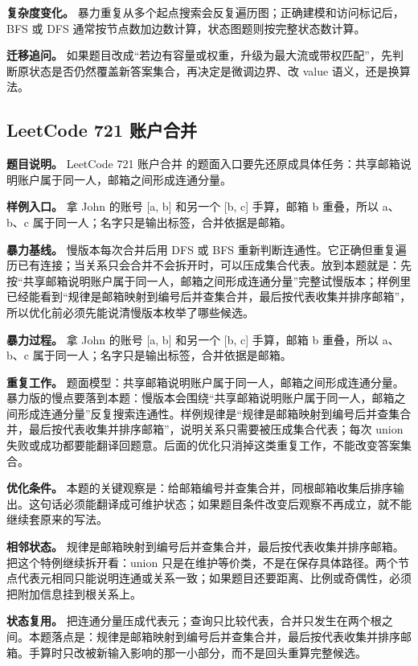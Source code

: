 \textbf{复杂度变化。} 暴力重复从多个起点搜索会反复遍历图；正确建模和访问标记后，BFS 或 DFS 通常按节点数加边数计算，状态图题则按完整状态数计算。

\textbf{迁移追问。} 如果题目改成“若边有容量或权重，升级为最大流或带权匹配”，先判断原状态是否仍然覆盖新答案集合，再决定是微调边界、改 value 语义，还是换算法。

\subsection{LeetCode 721 账户合并}

\textbf{题目说明。} LeetCode 721 账户合并 的题面入口要先还原成具体任务：共享邮箱说明账户属于同一人，邮箱之间形成连通分量。

\textbf{样例入口。} 拿 John 的账号 [a, b] 和另一个 [b, c] 手算，邮箱 b 重叠，所以 a、b、c 属于同一人；名字只是输出标签，合并依据是邮箱。

\textbf{暴力基线。} 慢版本每次合并后用 DFS 或 BFS 重新判断连通性。它正确但重复遍历已有连接；当关系只会合并不会拆开时，可以压成集合代表。放到本题就是：先按“共享邮箱说明账户属于同一人，邮箱之间形成连通分量”完整试慢版本；样例里已经能看到“规律是邮箱映射到编号后并查集合并，最后按代表收集并排序邮箱”，所以优化前必须先能说清慢版本枚举了哪些候选。

\textbf{暴力过程。} 拿 John 的账号 [a, b] 和另一个 [b, c] 手算，邮箱 b 重叠，所以 a、b、c 属于同一人；名字只是输出标签，合并依据是邮箱。

\textbf{重复工作。} 题面模型：共享邮箱说明账户属于同一人，邮箱之间形成连通分量。暴力版的慢点要落到本题：慢版本会围绕“共享邮箱说明账户属于同一人，邮箱之间形成连通分量”反复搜索连通性。样例规律是“规律是邮箱映射到编号后并查集合并，最后按代表收集并排序邮箱”，说明关系只需要被压成集合代表；每次 union 失败或成功都要能翻译回题意。后面的优化只消掉这类重复工作，不能改变答案集合。

\textbf{优化条件。} 本题的关键观察是：给邮箱编号并查集合并，同根邮箱收集后排序输出。这句话必须能翻译成可维护状态；如果题目条件改变后观察不再成立，就不能继续套原来的写法。

\textbf{相邻状态。} 规律是邮箱映射到编号后并查集合并，最后按代表收集并排序邮箱。把这个特例继续拆开看：union 只是在维护等价类，不是在保存具体路径。两个节点代表元相同只能说明连通或关系一致；如果题目还要距离、比例或奇偶性，必须把附加信息挂到根关系上。

\textbf{状态复用。} 把连通分量压成代表元；查询只比较代表，合并只发生在两个根之间。本题落点是：规律是邮箱映射到编号后并查集合并，最后按代表收集并排序邮箱。手算时只改被新输入影响的那一小部分，而不是回头重算完整候选。

